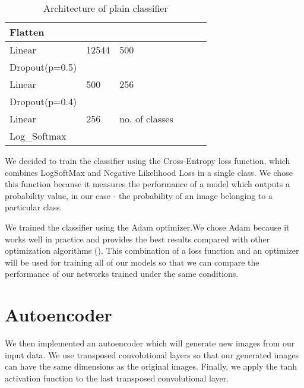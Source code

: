 \documentclass{l4proj}
\begin{document}
\begin{table}[ht!]
\begin{tabular}{|l|l|l|l|l|l|}
Flatten         &                       &                        &                       &                 &                  \\ \hline
Linear          & 12544                 & 500                    &                       &                 &                  \\ \hline
Dropout(p=0.5)  &                       &                        &                       &                 &                  \\ \hline
Linear          & 500                   & 256                    &                       &                 &                  \\ \hline
Dropout(p=0.4)  &                       &                        &                       &                 &                  \\ \hline
Linear          & 256                   & no. of classes         &                       &                 &                  \\ \hline
Log\_Softmax    &                       &                        &                       &                 &                  \\ \hline
\end{tabular}
\caption{Architecture of plain classifier}
\label{tab:classifier}
\end{table}

We decided to train the classifier using the Cross-Entropy loss function, which combines LogSoftMax and Negative Likelihood Loss in a single class. We chose this function because it measures the performance of a model which outputs a probability value, in our case - the probability of an image belonging to a particular class.

We trained the classifier using the Adam optimizer.We chose Adam because it works well in practice and provides the best results compared with other optimization algorithms (\cite{optimoverview}). This combination of a loss function and an optimizer will be used for training all of our models so that we can compare the performance of our networks trained under the same conditions.


\section{Autoencoder}
We then implemented an autoencoder which will generate new images from our input data. We use transposed convolutional layers so that our generated images can have the same dimensions as the original images.
Finally, we apply the tanh activation function to the last transposed convolutional layer.
\end{document}
